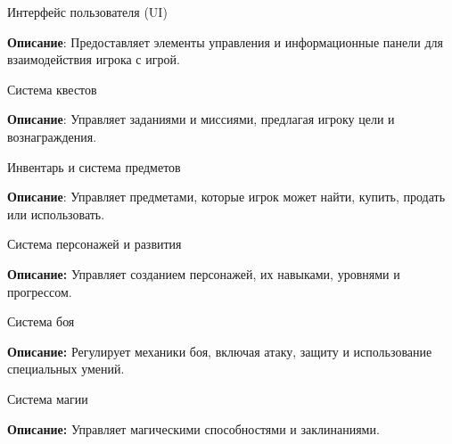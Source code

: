 \begin{DoxyEnumerate}
\item Интерфейс пользователя (UI)
\end{DoxyEnumerate}
\begin{DoxyItemize}
\item {\bfseries{Описание}}\+: Предоставляет элементы управления и информационные панели для взаимодействия игрока с игрой.
\end{DoxyItemize}
\begin{DoxyEnumerate}
\item Система квестов
\end{DoxyEnumerate}
\begin{DoxyItemize}
\item {\bfseries{Описание}}\+: Управляет заданиями и миссиями, предлагая игроку цели и вознаграждения.
\end{DoxyItemize}
\begin{DoxyEnumerate}
\item Инвентарь и система предметов
\end{DoxyEnumerate}
\begin{DoxyItemize}
\item {\bfseries{Описание}}\+: Управляет предметами, которые игрок может найти, купить, продать или использовать.
\end{DoxyItemize}
\begin{DoxyEnumerate}
\item Система персонажей и развития
\end{DoxyEnumerate}
\begin{DoxyItemize}
\item {\bfseries{Описание\+:}} Управляет созданием персонажей, их навыками, уровнями и прогрессом.
\end{DoxyItemize}
\begin{DoxyEnumerate}
\item Система боя
\end{DoxyEnumerate}
\begin{DoxyItemize}
\item {\bfseries{Описание\+:}} Регулирует механики боя, включая атаку, защиту и использование специальных умений.
\end{DoxyItemize}
\begin{DoxyEnumerate}
\item Система магии
\end{DoxyEnumerate}
\begin{DoxyItemize}
\item {\bfseries{Описание\+:}} Управляет магическими способностями и заклинаниями.
\end{DoxyItemize}

